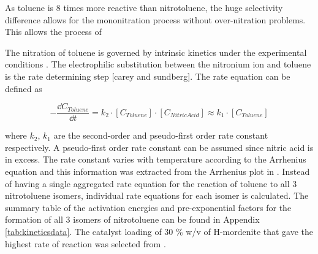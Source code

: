 
As toluene is 8 times more reactive than nitrotoluene, the huge selectivity difference allows for the mononitration process without over-nitration problems. This allows the process of 

The nitration of toluene is governed by intrinsic kinetics under the experimental conditions \cite{jeeru_kinetics_2018}. The electrophilic substitution between the  nitronium ion and toluene is the rate determining step [carey and sundberg]. The rate equation can be defined as  

\begin{equation}
-\frac{\dd C_{Toluene}}{\dd t} = k_{2} \cdot [C_{Toluene}] \cdot [C_{Nitric Acid}] \approx k_{1} \cdot [C_{Toluene}]
\end{equation}

where $k_2$, $k_1$ are the second-order and pseudo-first order rate constant respectively. A pseudo-first order rate constant can be assumed since nitric acid is in excess. The rate constant varies with temperature according to the Arrhenius equation and this information was extracted from the Arrhenius plot in \textcite{jeeru_kinetics_2018}. Instead of having a single aggregated rate equation for the reaction of toluene to all 3 nitrotoluene isomers, individual rate equations for each isomer is calculated. The summary table of the activation energies and pre-exponential factors for the formation of all 3 isomers of nitrotoluene can be found in Appendix \ref{tab:kineticsdata}. The catalyst loading of 30 \% w/v of H-mordenite that gave the highest rate of reaction was selected from \textcite{jeeru_kinetics_2018}.




